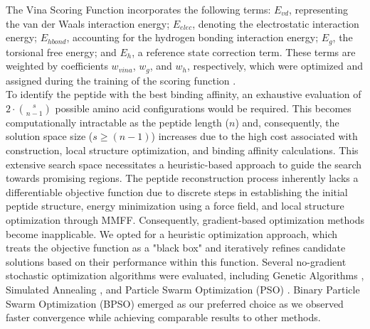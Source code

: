 The Vina Scoring Function incorporates the following terms: $E_{vd}$, representing the van der Waals interaction energy; $E_{elec}$, denoting the electrostatic interaction energy; $E_{hbond}$, accounting for the hydrogen bonding interaction energy; $E_g$, the torsional free energy; and $E_h$, a reference state correction term. These terms are weighted by coefficients $w_{vina}$, $w_g$, and $w_h$, respectively, which were optimized and assigned during the training of the scoring function \cite{trott2010autodock}. \\

To identify the peptide with the best binding affinity, an exhaustive evaluation of $2 \cdot {s \choose n-1}$ possible amino acid configurations would be required. This becomes computationally intractable as the peptide length ($n$) and, consequently, the solution space size ($s \geq (n-1)$) increases due to the high cost associated with construction, local structure optimization, and binding affinity calculations. This extensive search space necessitates a heuristic-based approach to guide the search towards promising regions. The peptide reconstruction process inherently lacks a differentiable objective function due to discrete steps in establishing the initial peptide structure, energy minimization using a force field, and local structure optimization through MMFF. Consequently, gradient-based optimization methods become inapplicable. We opted for a heuristic optimization approach, which treats the objective function as a "black box" and iteratively refines candidate solutions based on their performance within this function. Several no-gradient stochastic optimization algorithms were evaluated, including Genetic Algorithms \cite{holland1992adaptation}, Simulated Annealing \cite{kirkpatrick1983optimization}, and Particle Swarm Optimization (PSO) \cite{eberhart1995new, kennedy1995particle}. Binary Particle Swarm Optimization (BPSO) emerged as our preferred choice as we observed faster convergence while achieving comparable results to other methods. \\

